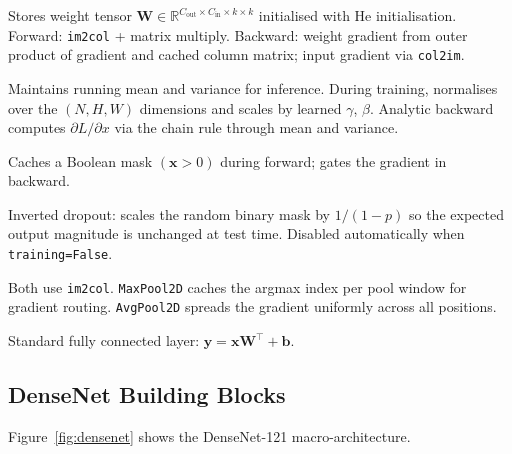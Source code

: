 \documentclass[12pt,a4paper]{report}
\begin{document}
\begin{description}[leftmargin=0pt, style=nextline]
  \item[\texttt{Conv2D}]
    Stores weight tensor $\mathbf{W} \in \mathbb{R}^{C_{\text{out}} \times C_{\text{in}} \times k \times k}$ initialised with He initialisation. Forward: \texttt{im2col} + matrix multiply. Backward: weight gradient from outer product of gradient and cached column matrix; input gradient via \texttt{col2im}.

  \item[\texttt{BatchNorm2D}]
    Maintains running mean and variance for inference. During training, normalises over the $(N, H, W)$ dimensions and scales by learned $\gamma$, $\beta$. Analytic backward computes $\partial L/\partial x$ via the chain rule through mean and variance.

  \item[\texttt{ReLU}]
    Caches a Boolean mask $(\mathbf{x} > 0)$ during forward; gates the gradient in backward.

  \item[\texttt{Dropout}]
    Inverted dropout: scales the random binary mask by $1/(1-p)$ so the expected output magnitude is unchanged at test time. Disabled automatically when \texttt{training=False}.

  \item[\texttt{MaxPool2D} / \texttt{AvgPool2D}]
    Both use \texttt{im2col}. \texttt{MaxPool2D} caches the argmax index per pool window for gradient routing. \texttt{AvgPool2D} spreads the gradient uniformly across all positions.

  \item[\texttt{Linear}]
    Standard fully connected layer: $\mathbf{y} = \mathbf{x}\mathbf{W}^{\top} + \mathbf{b}$.
\end{description}

\subsection{DenseNet Building Blocks}

Figure~\ref{fig:densenet} shows the DenseNet-121 macro-architecture.
\end{document}
